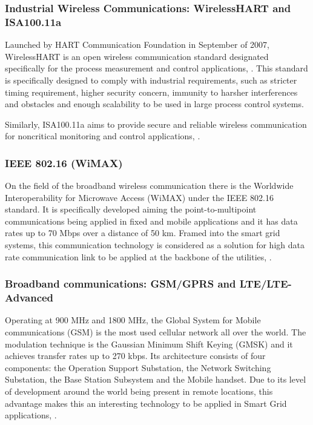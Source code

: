 \subsubsection{Industrial Wireless Communications: WirelessHART and ISA100.11a}

Launched by HART Communication Foundation in September of 2007, WirelessHART is an open wireless communication standard designated specifically for the process measurement and control applications, \cite{Song2008}. This standard is specifically designed to comply with industrial requirements, such as stricter timing requirement, higher security concern, immunity to harsher interferences and obstacles and enough scalability to be used in large process control systems.

Similarly, ISA100.11a aims to provide secure and reliable wireless communication for noncritical monitoring and control applications, \cite{Petersen2011}.





\subsubsection{IEEE 802.16 (WiMAX)}

On the field of the broadband wireless communication there is the Worldwide Interoperability for Microwave Access (WiMAX) under the IEEE 802.16 standard. It is specifically developed aiming the point-to-multipoint communications being applied in fixed and mobile applications and it has data rates up to 70 Mbps over a distance of 50 km. Framed into the smart grid systems, this communication technology is considered as a solution for high data rate communication link to be applied at the backbone of the utilities, \cite{Usman2013}.


\subsubsection{Broadband communications: GSM/GPRS and LTE/LTE-Advanced}

Operating at 900 MHz and 1800 MHz, the Global System for Mobile communications (GSM) is the most used cellular network all over the world. The modulation technique is the Gaussian Minimum Shift Keying (GMSK) and it achieves transfer rates up to 270 kbps. Its architecture consists of four components: the Operation Support Substation, the Network Switching Substation, the Base Station Subsystem and the Mobile handset. Due to its level of development around the world being present in remote locations, this advantage makes this  an interesting technology to be applied in Smart Grid applications, \cite{Usman2013}.

